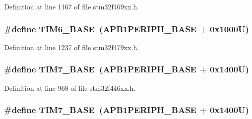 Definition at line 1167 of file stm32f469xx.\+h.

\subsubsection[{\texorpdfstring{T\+I\+M6\+\_\+\+B\+A\+SE}{TIM6_BASE}}]{\setlength{\rightskip}{0pt plus 5cm}\#define T\+I\+M6\+\_\+\+B\+A\+SE~({\bf A\+P\+B1\+P\+E\+R\+I\+P\+H\+\_\+\+B\+A\+SE} + 0x1000\+U)}\hypertarget{group___peripheral__memory__map_ga8268ec947929f192559f28c6bf7d1eac}{}\label{group___peripheral__memory__map_ga8268ec947929f192559f28c6bf7d1eac}


Definition at line 1237 of file stm32f479xx.\+h.

\subsubsection[{\texorpdfstring{T\+I\+M7\+\_\+\+B\+A\+SE}{TIM7_BASE}}]{\setlength{\rightskip}{0pt plus 5cm}\#define T\+I\+M7\+\_\+\+B\+A\+SE~({\bf A\+P\+B1\+P\+E\+R\+I\+P\+H\+\_\+\+B\+A\+SE} + 0x1400\+U)}\hypertarget{group___peripheral__memory__map_ga0ebf54364c6a2be6eb19ded6b18b6387}{}\label{group___peripheral__memory__map_ga0ebf54364c6a2be6eb19ded6b18b6387}


Definition at line 968 of file stm32f446xx.\+h.

\subsubsection[{\texorpdfstring{T\+I\+M7\+\_\+\+B\+A\+SE}{TIM7_BASE}}]{\setlength{\rightskip}{0pt plus 5cm}\#define T\+I\+M7\+\_\+\+B\+A\+SE~({\bf A\+P\+B1\+P\+E\+R\+I\+P\+H\+\_\+\+B\+A\+SE} + 0x1400\+U)}\hypertarget{group___peripheral__memory__map_ga0ebf54364c6a2be6eb19ded6b18b6387}{}\label{group___peripheral__memory__map_ga0ebf54364c6a2be6eb19ded6b18b6387}


